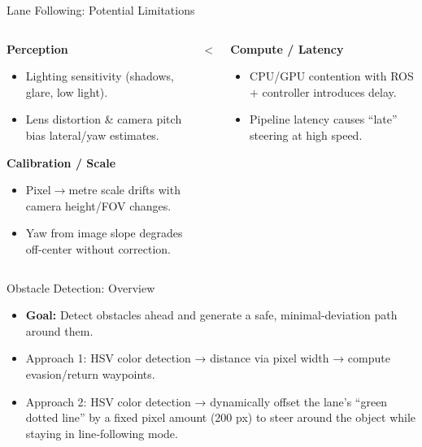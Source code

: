 \documentclass[aspectratio=169,12pt]{beamer}
\begin{document}
\begin{frame}[t]{Lane Following: Potential Limitations}
  \vspace*{-0.3em}
  \begin{columns}[T]
    \begin{column}{0.54\textwidth}
      \textbf{Perception}
      \begin{itemize}\setlength{\itemsep}{0.35em}
        \item Lighting sensitivity (shadows, glare, low light).
        \item Lens distortion & camera pitch bias lateral/yaw estimates.
      \end{itemize}
      \vspace{0.6em}
      \textbf{Calibration / Scale}
      \begin{itemize}\setlength{\itemsep}{0.35em}
        \item Pixel\(\rightarrow\)metre scale drifts with camera height/FOV changes.
        \item Yaw from image slope degrades off-center without correction.
      \end{itemize}
    \end{column}
    <\begin{column}{0.46\textwidth}
      \textbf{Compute / Latency}
      \begin{itemize}\setlength{\itemsep}{0.35em}
        \item CPU/GPU contention with ROS + controller introduces delay.
        \item Pipeline latency causes “late” steering at high speed.
      \end{itemize}
      \vspace{0.6em}
 
    \end{column}
  \end{columns}
\end{frame}


\begin{frame}[t]{Obstacle Detection: Overview}
  \vspace*{-0.3em}
  \begin{itemize}\setlength{\itemsep}{0.45em}
    \item \textbf{Goal:} Detect obstacles ahead and generate a safe, minimal‑deviation path around them.
    \item Approach 1: HSV color detection → distance via pixel width → compute evasion/return waypoints.
    \item Approach 2: HSV color detection → dynamically offset the lane’s “green dotted line” by a fixed pixel amount (200 px) to steer around the object while staying in line‑following mode.
  \end{itemize}
\end{frame}
\end{document}
